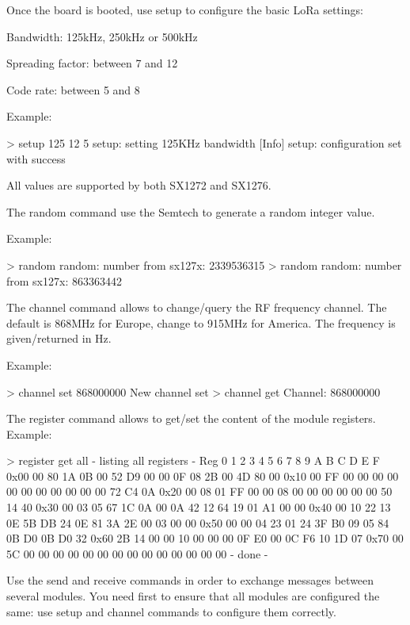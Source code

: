 Once the board is booted, use {\ttfamily setup} to configure the basic Lo\+Ra settings\+:
\begin{DoxyItemize}
\item Bandwidth\+: 125k\+Hz, 250k\+Hz or 500k\+Hz
\item Spreading factor\+: between 7 and 12
\item Code rate\+: between 5 and 8
\end{DoxyItemize}

Example\+: 
\begin{DoxyCode}
> setup 125 12 5
setup: setting 125KHz bandwidth
[Info] setup: configuration set with success
\end{DoxyCode}


All values are supported by both S\+X1272 and S\+X1276.

The {\ttfamily random} command use the Semtech to generate a random integer value.

Example\+: 
\begin{DoxyCode}
> random
random: number from sx127x: 2339536315
> random
random: number from sx127x: 863363442
\end{DoxyCode}


The {\ttfamily channel} command allows to change/query the RF frequency channel. The default is 868\+M\+Hz for Europe, change to 915\+M\+Hz for America. The frequency is given/returned in Hz.

Example\+: 
\begin{DoxyCode}
> channel set 868000000
New channel set
> channel get
Channel: 868000000
\end{DoxyCode}


The {\ttfamily register} command allows to get/set the content of the module registers. Example\+: 
\begin{DoxyCode}
> register get all
- listing all registers -
Reg   0  1  2  3  4  5  6  7  8  9  A  B  C  D  E  F
0x00 00 80 1A 0B 00 52 D9 00 00 0F 08 2B 00 4D 80 00
0x10 00 FF 00 00 00 00 00 00 00 00 00 00 00 72 C4 0A
0x20 00 08 01 FF 00 00 08 00 00 00 00 00 00 50 14 40
0x30 00 03 05 67 1C 0A 00 0A 42 12 64 19 01 A1 00 00
0x40 00 10 22 13 0E 5B DB 24 0E 81 3A 2E 00 03 00 00
0x50 00 00 04 23 01 24 3F B0 09 05 84 0B D0 0B D0 32
0x60 2B 14 00 00 10 00 00 00 0F E0 00 0C F6 10 1D 07
0x70 00 5C 00 00 00 00 00 00 00 00 00 00 00 00 00 00
- done -
\end{DoxyCode}


Use the {\ttfamily send} and {\ttfamily receive} commands in order to exchange messages between several modules. You need first to ensure that all modules are configured the same\+: use {\ttfamily setup} and {\ttfamily channel} commands to configure them correctly.

